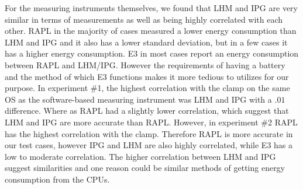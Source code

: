 For the measuring instruments themselves, we found that LHM and IPG are very similar in terms of measurements as well as being highly correlated with each other. RAPL in the majority of cases measured a lower energy consumption than LHM and IPG and it also has a lower standard deviation, but in a few cases it has a higher energy consumption. E3 in most cases report an energy consumption between RAPL and LHM/IPG. However the requirements of having a battery and the method of which E3 functions makes it more tedious to utilizes for our purpose. In experiment \#1, the highest correlation with the clamp on the same OS as the software-based measuring instrument was LHM and IPG with a $.01$ difference. Where as RAPL had a slightly lower correlation, which suggest that LHM and IPG are more accurate than RAPL. However, in experiment \#2 RAPL has the highest correlation with the clamp. Therefore RAPL is more accurate in our test cases, however IPG and LHM are also highly correlated, while E3 has a low to moderate correlation. The higher correlation between LHM and IPG suggest similarities and one reason could be similar methods of getting energy consumption from the CPUs. 
